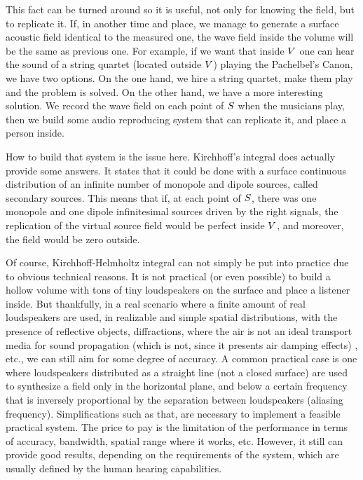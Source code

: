 This fact can be turned around so it is useful, not only for knowing the field, but to replicate it.
If, in another time and place, we manage to generate a surface acoustic field identical to the measured one, the wave field inside the volume will be the same as previous one.
For example, if we want that inside $V$ one can hear the sound of a string quartet (located outside $V$) playing the Pachelbel's Canon, we have two options. On the one hand, we hire a string quartet, make them play and the problem is solved. On the other hand, we have a more interesting solution. We record the wave field on each point of $S$ when the musicians play, then we build some audio reproducing system that can replicate it, and place a person inside.

How to build that system is the issue here. Kirchhoff's integral does actually provide some answers. It states that it could be done with a surface continuous distribution of an infinite number of monopole and dipole sources, called secondary sources. This means that if, at each point of $S$, there was one monopole and one dipole infinitesimal sources driven by the right signals, the replication of the virtual source field would be perfect inside $V$, and moreover, the field would be zero outside.

Of course, Kirchhoff-Helmholtz integral can not simply be put into practice due to obvious technical reasons. It is not practical (or even possible) to build a hollow volume with tons of tiny loudspeakers on the surface and place a listener inside.
But thankfully, in a real scenario where a finite amount of real loudspeakers are used, in realizable and simple spatial distributions, with the presence of reflective objects, diffractions, where the air is not an ideal transport media for sound propagation (which is not, since it presents air damping effects)%
, etc., we can still aim for some degree of accuracy.
A common practical case is one where loudspeakers distributed as a straight line (not a closed surface) are used to synthesize a field only in the horizontal plane, and below a certain frequency that is inversely proportional by the separation between loudspeakers (aliasing frequency). Simplifications such as that, are necessary to implement a feasible practical system. The price to pay is the limitation of the performance in terms of accuracy, bandwidth, spatial range where it works, etc. However, it still can provide good results, depending on the requirements of the system, which are usually defined by the human hearing capabilities.

